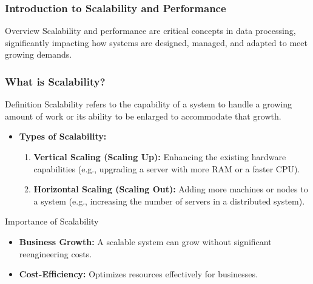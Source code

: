 \documentclass[aspectratio=169]{beamer}
\begin{document}
\frame{\titlepage}

\begin{frame}[fragile]
    \frametitle{Introduction to Scalability and Performance}
    \begin{block}{Overview}
        Scalability and performance are critical concepts in data processing, significantly impacting how systems are designed, managed, and adapted to meet growing demands. 
    \end{block}
\end{frame}

\begin{frame}[fragile]
    \frametitle{What is Scalability?}
    \begin{block}{Definition}
        Scalability refers to the capability of a system to handle a growing amount of work or its ability to be enlarged to accommodate that growth.
    \end{block}

    \begin{itemize}
        \item \textbf{Types of Scalability:} 
        \begin{enumerate}
            \item \textbf{Vertical Scaling (Scaling Up):} Enhancing the existing hardware capabilities (e.g., upgrading a server with more RAM or a faster CPU).
            \item \textbf{Horizontal Scaling (Scaling Out):} Adding more machines or nodes to a system (e.g., increasing the number of servers in a distributed system).
        \end{enumerate}
    \end{itemize}

    \begin{block}{Importance of Scalability}
        \begin{itemize}
            \item \textbf{Business Growth:} A scalable system can grow without significant reengineering costs.
            \item \textbf{Cost-Efficiency:} Optimizes resources effectively for businesses.
        \end{itemize}
    \end{block}
\end{frame}
\end{document}
